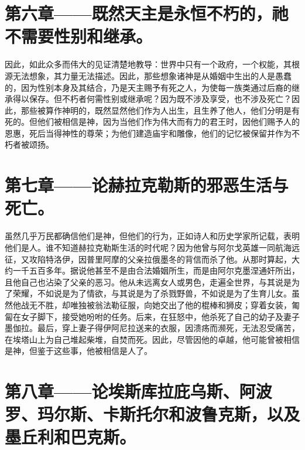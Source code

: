 
\section{第六章——既然天主是永恒不朽的，祂不需要性别和继承。}

因此，如此众多而伟大的见证清楚地教导：世界中只有一个政府，一个权能，其根源无法想象，其力量无法描述。因此，那些想象诸神是从婚姻中生出的人是愚蠢的，因为性别本身及其结合，乃是天主赐予有死之人，为使每一族类通过后裔的继承得以保存。但不朽者何需性别或继承呢？因为既不涉及享受，也不涉及死亡？因此，那些被算作神明的，既然显然他们作为人出生，且生养了他人，他们分明是有死的。但他们被相信是神，因为当他们作为伟大而有力的君王时，因他们赐予人的恩惠，死后当得神性的尊荣；为他们建造庙宇和雕像，他们的记忆被保留并作为不朽者被颂扬。\par


\section{第七章——论赫拉克勒斯的邪恶生活与死亡。}

虽然几乎万民都确信他们是神，但他们的行为，正如诗人和历史学家所记载，表明他们是人。谁不知道赫拉克勒斯生活的时代呢？因为他曾与阿尔戈英雄一同航海远征，又攻陷特洛伊，因普里阿摩的父亲拉俄墨冬的背信而杀了他。从那时算起，大约一千五百多年。据说他甚至不是由合法婚姻所生，而是由阿尔克墨涅通奸所出，且他自己也沾染了父亲的恶习。他从未远离女人或男色，走遍全世界，与其说是为了荣耀，不如说是为了情欲，与其说是为了杀戮野兽，不如说是为了生育儿女。虽然他战无不胜，却唯独被翁法勒征服，向她交出了他的棍棒和狮皮；穿着女装，匍匐在女子脚下，接受她吩咐的任务。后来，在狂怒中，他杀死了自己的幼子及妻子墨伽拉。最后，穿上妻子得伊阿尼拉送来的衣服，因溃疡而濒死，无法忍受痛苦，在埃塔山上为自己堆起柴堆，自焚而死。因此，尽管因他的卓越，他可能曾被相信是神，但鉴于这些事，他被相信是人了。\par


\section{第八章——论埃斯库拉庇乌斯、阿波罗、玛尔斯、卡斯托尔和波鲁克斯，以及墨丘利和巴克斯。}

